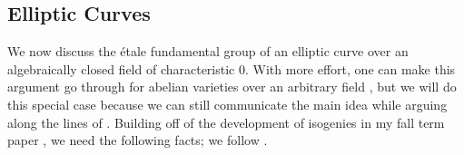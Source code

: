 \documentclass{amsart}
\begin{document}

\subsection{Elliptic Curves}
We now discuss the \'etale fundamental group of an elliptic curve over an algebraically closed field of characteristic $0$. With more effort, one can make this argument go through for abelian varieties over an arbitrary field \cite[Corollary~10.37]{egm-av}, but we will do this special case because we can still communicate the main idea while arguing along the lines of . Building off of the development of isogenies in my fall term paper \cite[Section~2.3]{elber-av}, we need the following facts; we follow \cite{egm-av}.
\end{document}
